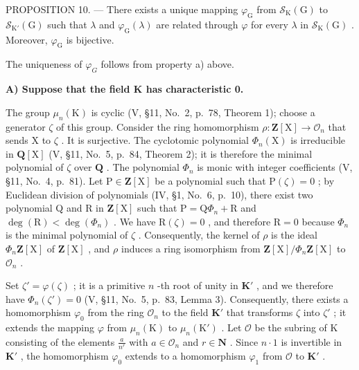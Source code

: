 PROPOSITION 10. --- There exists a unique mapping \(\varphi_{\mathrm{G}}\) from \(\mathcal{S}_{\mathrm{K}}(\mathrm{G})\) to \(\mathcal{S}_{\mathrm{K}'}(\mathrm{G})\) such that \(\lambda\) and \(\varphi_{\mathrm{G}}(\lambda)\) are related through \(\varphi\) for every \(\lambda\) in \(\mathcal{S}_{\mathrm{K}}(\mathrm{G})\) . Moreover, \(\varphi_{\mathrm{G}}\) is bijective.

The uniqueness of \(\varphi_{G}\) follows from property a) above.

\textbf{A) Suppose that the field K has characteristic 0.}

The group \(\mu_n(\mathrm{K})\) is cyclic (V, §11, No.~2, p.~78, Theorem 1); choose a generator \(\zeta\) of this group. Consider the ring homomorphism \(\rho: \mathbf{Z}[\mathrm{X}] \to \mathcal{O}_n\) that sends X to \(\zeta\) . It is surjective. The cyclotomic polynomial \(\Phi_n(\mathrm{X})\) is irreducible in \(\mathbf{Q}[\mathrm{X}]\) (V, §11, No.~5, p.~84, Theorem 2); it is therefore the minimal polynomial of \(\zeta\) over \(\mathbf{Q}\) . The polynomial \(\Phi_n\) is monic with integer coefficients (V, §11, No.~4, p.~81). Let \(\mathrm{P} \in \mathbf{Z}[\mathrm{X}]\) be a polynomial such that \(\mathrm{P}(\zeta) = 0\) ; by Euclidean division of polynomials (IV, §1, No.~6, p.~10), there exist two polynomial Q and R in \(\mathbf{Z}[\mathrm{X}]\) such that \(\mathrm{P} = \mathrm{Q}\Phi_n + \mathrm{R}\) and \(\deg(\mathrm{R}) < \deg(\Phi_n)\) . We have \(\mathrm{R}(\zeta) = 0\) , and therefore \(\mathrm{R} = 0\) because \(\Phi_n\) is the minimal polynomial of \(\zeta\) . Consequently, the kernel of \(\rho\) is the ideal \(\Phi_n\mathbf{Z}[\mathrm{X}]\) of \(\mathbf{Z}[\mathrm{X}]\) , and \(\rho\) induces a ring isomorphism from \(\mathbf{Z}[\mathrm{X}] / \Phi_n\mathbf{Z}[\mathrm{X}]\) to \(\mathcal{O}_n\) .

Set \(\zeta' = \varphi(\zeta)\) ; it is a primitive \(n\) -th root of unity in \(\mathbf{K}'\) , and we therefore have \(\Phi_n(\zeta') = 0\) (V, §11, No.~5, p.~83, Lemma 3). Consequently, there exists a homomorphism \(\varphi_0\) from the ring \(\mathcal{O}_n\) to the field \(\mathbf{K}'\) that transforms \(\zeta\) into \(\zeta'\) ; it extends the mapping \(\varphi\) from \(\mu_n(\mathrm{K})\) to \(\mu_n(\mathrm{K}')\) . Let \(\mathcal{O}\) be the subring of \(\mathrm{K}\) consisting of the elements \(\frac{a}{n^r}\) with \(a \in \mathcal{O}_n\) and \(r \in \mathbf{N}\) . Since \(n \cdot 1\) is invertible in \(\mathbf{K}'\) , the homomorphism \(\varphi_0\) extends to a homomorphism \(\varphi_1\) from \(\mathcal{O}\) to \(\mathbf{K}'\) .

